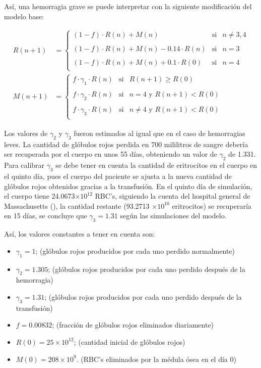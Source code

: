 Así, una hemorragia grave se puede interpretar con la siguiente modificación del modelo base:

\begin{align}\label{eq:HemoGrave}
    R(n+1) &= \left\{ \begin{array}{lcc} (1-f)\cdot R(n)+M(n) & \textrm{si} & n \neq 3,4 \\ \\ (1-f)\cdot R(n)+M(n)-0.14\cdot R(n) & \textrm{si} & n = 3 \\ \\ (1-f)\cdot R(n)+M(n)+0.1\cdot R(0) & \textrm{si} & n = 4 \\ \end{array} \right. \\
    M(n+1) &=\left\{ \begin{array}{lcc} f\cdot \gamma_1 \cdot R(n) & \textrm{si} & R(n+1) \geq R(0) \\ \\ f\cdot \gamma_2\cdot R(n) & \textrm{si} & n = 4\textrm{ y } R(n+1)<R(0) \\ \\ f\cdot \gamma_3\cdot R(n) & \textrm{si} & n \neq 4\textrm{ y } R(n+1)<R(0)\\ \end{array} \right. \nonumber
\end{align}

Los valores de $\gamma_2$ y $\gamma_3$ fueron estimados al igual que en el caso de hemorragias leves. La cantidad de glóbulos rojos perdida en 700 mililitros de sangre debería ser recuperada por el cuerpo en unos 55 días, obteniendo un valor de $\gamma_2$ de 1.331. Para calibrar $\gamma_3$ se debe tener en cuenta la cantidad de eritrocitos en el cuerpo en el quinto día, pues el cuerpo del paciente se ajusta a la nueva cantidad de glóbulos rojos obtenidos gracias a la transfusión. En el quinto día de simulación, el cuerpo tiene 24.0673$\times 10^{12}$ RBC's, siguiendo la cuenta del hospital general de Massachusetts (\cite{Massachusetts}), la cantidad restante (93.2713 $\times 10^{10}$ eritrocitos) se recuperaría en 15 días, se concluye que $\gamma_3 = 1.31$ según las simulaciones del modelo.

Así, los valores constantes a tener en cuenta son:
\begin{itemize}
    \item $\gamma_1=1$; (glóbulos rojos producidos por cada uno perdido normalmente)
    \item $\gamma_2=1.305$; (glóbulos rojos producidos por cada uno perdido después de la hemorragia)
    \item $\gamma_3=1.31$; (glóbulos rojos producidos por cada uno perdido después de la transfusión)
    \item $f=0.00832$; (fracción de glóbulos rojos eliminados diariamente)
    \item $R(0) = 25\times 10^{12}$; (cantidad inicial de glóbulos rojos)
    \item $M(0) = 208 \times 10^{9}$. (RBC's eliminados por la médula ósea en el día 0)
\end{itemize}

